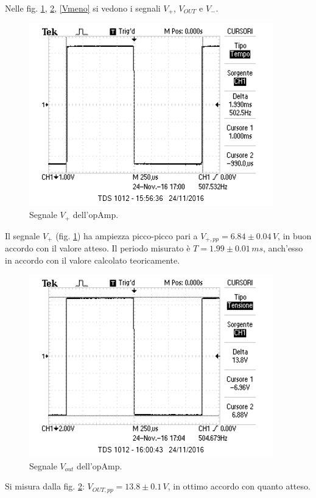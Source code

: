 \documentclass[10pt,a4paper]{article}
\begin{document}
Nelle fig. \ref{Vpiu}, \ref{Vout}, \ref{Vmeno} si vedono i segnali $V_{+}$, $V_{OUT}$ e $V_{-}$.\\

\begin{figure}[htb!]
\centering
\includegraphics[scale=1.0]{immagini/multivibratoreVPIU.png}
\caption{Segnale $V_{+}$ dell'opAmp.}
\label{Vpiu}
\end{figure}

Il segnale $V_{+}$ (fig. \ref{Vpiu}) ha ampiezza picco-picco pari a $V_{+, pp} = 6.84 \pm 0.04\, V$, in buon accordo con il valore atteso. Il periodo misurato è $T = 1.99 \pm 0.01 \, ms$, anch'esso in accordo con il valore calcolato teoricamente.


\begin{figure}[htb!]
\centering
\includegraphics[scale=1.0]{immagini/multivibratoreVOUT.png}
\caption{Segnale $V_{out}$ dell'opAmp.}
\label{Vout}
\end{figure}

Si misura dalla fig. \ref{Vout}: $V_{OUT, pp} = 13.8 \pm 0.1\, V$, in ottimo accordo con quanto atteso.
\end{document}
